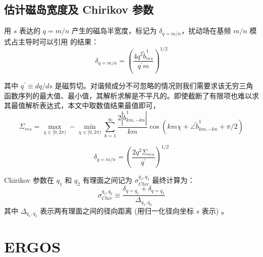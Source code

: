 \subsection{估计磁岛宽度及 Chirikov 参数}
用 $s$ 表达的 $q=m / n$ 产生的磁岛半宽度，标记为 $\delta_{q=m / n}$，扰动场在基频 $m/n$ 模式占主导时可以引用 \cite{nardon_edge_2007} 的结果：
\begin{equation}
  \delta_{q=m / n}=\left(\frac{4 q^{2} \tilde{b}_{r e s}^{1}}{q^{\prime} m}\right)^{1 / 2}
\end{equation}

其中 $q^{\prime} \equiv d q / d s$ 是磁剪切。对谐频成分不可忽略的情况则我们需要求该无穷三角函数序列的最大值、最小值，其解析求解是不平凡的。即使截断了有限项也难以求其最值解析表达式，本文中取数值结果最值即可，
\begin{equation}
  \Sigma_{res} = \max_{\chi\in [0,2\pi)} - \min_{\chi\in [0,2\pi)}\sum_{k=1}^{\infty} \frac{2\left|\tilde{b}_{km,-kn}^{1}\right|}{km}   \cos \left(km\chi + \angle\tilde{b}_{km,-kn}^{1} + \pi/2 \right)
\end{equation}


\begin{equation}
  \delta_{q=m / n}=\left(\frac{2 q^{2} \Sigma_{res}}{q^{\prime} }\right)^{1 / 2}
\end{equation}

Chirikov 参数在 $q_1$ 和 $q_2$ 有理面之间记为 $\sigma_{C h i r}^{q_1, q_2}$ 最终计算为：
\[
\sigma_{C h i r}^{q_1, q_2} \equiv \frac{\delta_{q=q_1}+\delta_{q=q_2}}{\Delta_{q_1, q_2}}
\]
其中 $\Delta_{q_1, q_2}$ 表示两有理面之间的径向距离 (用归一化径向坐标 $s$ 表示) 。


\section{ERGOS}

